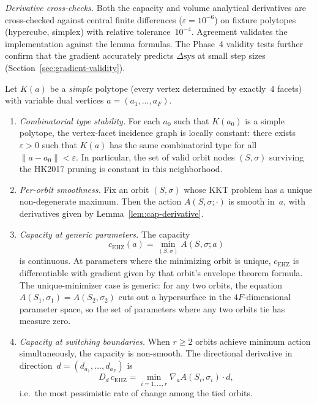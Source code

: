 \emph{Derivative cross-checks.}
Both the capacity and volume analytical derivatives are cross-checked against
central finite differences ($\varepsilon = 10^{-6}$) on fixture polytopes
(hypercube, simplex) with relative tolerance~$10^{-4}$.
Agreement validates the implementation against the lemma formulas.
The Phase~4 validity tests further confirm that the gradient accurately
predicts $\Delta\mathrm{sys}$ at small step sizes
(Section~\ref{sec:gradient-validity}).

\begin{unverified}
\begin{proposition}
\label{prop:capacity-piecewise-smooth}
Let $K(a)$ be a \emph{simple} polytope (every vertex determined by exactly~$4$
facets) with variable dual vertices $a = (a_1,\dots,a_F)$.
\begin{enumerate}
\item[\textup{(a)}]
  \emph{Combinatorial type stability.}
  For each $a_0$ such that $K(a_0)$ is a simple polytope, the vertex-facet
  incidence graph is locally constant: there exists $\varepsilon > 0$ such that
  $K(a)$ has the same combinatorial type for all $\|a - a_0\| < \varepsilon$.
  In particular, the set of valid orbit nodes $(S,\sigma)$ surviving
  the HK2017 pruning is constant in this neighborhood.

\item[\textup{(b)}]
  \emph{Per-orbit smoothness.}
  Fix an orbit $(S,\sigma)$ whose KKT problem has a unique non-degenerate
  maximum. Then the action $A(S,\sigma;\cdot)$ is smooth in~$a$,
  with derivatives given by Lemma~\ref{lem:cap-derivative}.

\item[\textup{(c)}]
  \emph{Capacity at generic parameters.}
  The capacity
  \[ c_{\mathrm{EHZ}}(a) = \min_{(S,\sigma)} A(S,\sigma;a) \]
  is continuous.
  At parameters where the minimizing orbit is unique, $c_{\mathrm{EHZ}}$ is
  differentiable with gradient given by that orbit's envelope theorem
  formula. The unique-minimizer case is generic: for any two orbits,
  the equation $A(S_1,\sigma_1) = A(S_2,\sigma_2)$ cuts out a hypersurface
  in the $4F$-dimensional parameter space, so the set of parameters where
  any two orbits tie has measure zero.

\item[\textup{(d)}]
  \emph{Capacity at switching boundaries.}
  When $r \ge 2$ orbits achieve minimum action simultaneously,
  the capacity is non-smooth.
  The directional derivative in direction~$d = (d_{a_1},\dots,d_{a_F})$ is
  \[
    D_d\,c_{\mathrm{EHZ}}
    = \min_{i=1,\dots,r} \nabla_a A(S_i,\sigma_i) \cdot d,
  \]
  i.e.\ the most pessimistic rate of change among the tied orbits.
\end{enumerate}
\end{proposition}


\end{unverified}
